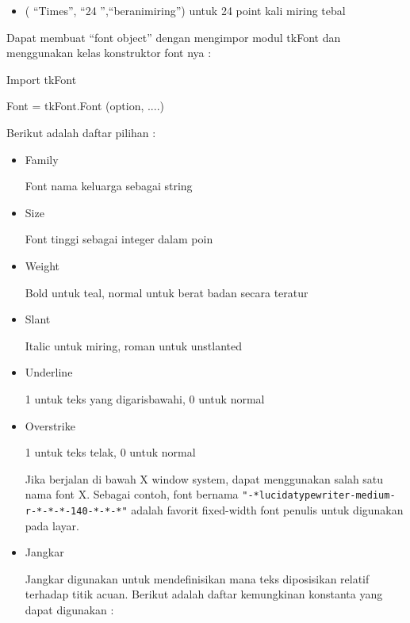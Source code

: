 \documentclass [12pt,a4paper,notitlepage,oneside,bahasa]{article}
\begin{document}
\begin{enumerate}
\begin{itemize}
\begin{itemize}
		\noindent 
		\item ( ``Times'', ``24 '',``beranimiring'') untuk 24 \- point kali miring tebal
	\end{itemize}
 		\par
\vspace{12pt}
Dapat membuat  ``font object'' dengan mengimpor modul tkFont dan menggunakan kelas konstruktor font nya : \par
Import tkFont \par
Font = tkFont.Font (option, ....) \par
\vspace{12pt}
Berikut adalah daftar pilihan : \par
\noindent 
\begin{itemize}
	\item Family \par
	Font nama keluarga sebagai string \par
	\noindent 
	\item Size \par
	Font tinggi sebagai integer dalam poin \par
	\noindent 
	\item Weight \par
	Bold untuk teal, normal untuk berat badan secara teratur \par
	\noindent 
	\item Slant \par
	Italic untuk miring, roman untuk unstlanted \par
	\noindent 
	\item Underline \par
	1 untuk teks yang digarisbawahi, 0 untuk normal \par
	\noindent 
	\item Overstrike \par
	1 untuk teks telak, 0 untuk normal \par
	Jika berjalan di bawah X window system, dapat menggunakan salah satu nama font X. Sebagai contoh, font bernama  \verb|"-*lucidatypewriter-medium-r-*-*-*-140-*-*-*"| adalah favorit fixed-width font penulis untuk digunakan pada layar. \par
	\noindent 
	\item Jangkar \par
	\noindent 
	Jangkar digunakan untuk mendefinisikan mana teks diposisikan relatif terhadap titik acuan. Berikut adalah daftar kemungkinan konstanta yang dapat digunakan :
	\noindent
	\begin{itemize}

\end{itemize}
\end{itemize}
\end{itemize}
\end{enumerate}
\end{document}
